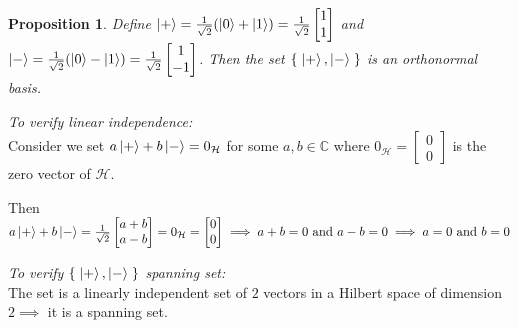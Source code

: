 \documentclass[12pt,twoside,fleqn]{report}
\makeatletter
\theoremstyle{thmstyle}
\renewenvironment{proof}[1][\proofname]{\par
\pushQED{\qed}%
\normalfont \topsep6\p@\@plus6\p@\relax
\trivlist
\item[\hskip\labelsep\itshape#1\@addpunct{.}]\mbox{}\par\nobreak\ignorespaces
}{%
    \popQED\endtrivlist\@endpefalse
    }
\newtheorem{prop}{Proposition}[chapter]
\makeatother
\begin{document}
\begin{prop}
    Define $\ket{+} = \frac{1}{\sqrt{2}} ( \ket{0} + \ket{1} ) = \frac{1}{\sqrt{2}} \begin{bmatrix} 1 \\ 1 \end{bmatrix}$ and $\ket{-} = \frac{1}{\sqrt{2}} (\ket{0} - \ket{1}) = \frac{1}{\sqrt{2}} \begin{bmatrix} 1 \\ -1 \end{bmatrix}$. Then the set $\{ \; \ket{+}, \ket{-} \; \}$ is an orthonormal basis. 
\end{prop}
\begin{proof}
    \emph{To verify linear independence:} \\
    Consider we set $a \ket{+} + b \ket{-} = 0_\mathcal{H}$ for some $a, b \in \mathbb{C}$ where $0_\mathcal{H} = \begin{bmatrix} 0 \\ 0 \end{bmatrix}$ is the zero vector of $\mathcal{H}$.

        Then $a \ket{+} + b \ket{-} = \frac{1}{\sqrt{2}} \begin{bmatrix} a + b \\ a - b \end{bmatrix} = 0_\mathcal{H} = \begin{bmatrix} 0 \\ 0 \end{bmatrix} \implies a + b = 0 \text { and } a - b = 0 \implies a  = 0 \text{ and } b = 0$

    \emph{To verify $\{ \; \ket{+}, \ket{-} \; \} $ spanning set:} \\
    The set is a linearly independent set of $2$ vectors in a Hilbert space of dimension $2 \implies$  it is a spanning set.


\end{proof}
\end{document}
